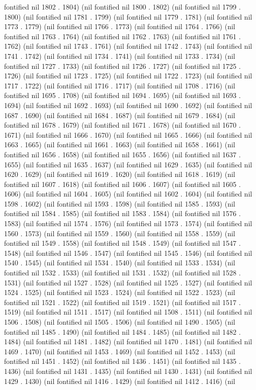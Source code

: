fontified nil 1802 . 1804) (nil fontified nil 1800 . 1802) (nil fontified nil 1799 . 1800) (nil fontified nil 1781 . 1799) (nil fontified nil 1779 . 1781) (nil fontified nil 1773 . 1779) (nil fontified nil 1766 . 1773) (nil fontified nil 1764 . 1766) (nil fontified nil 1763 . 1764) (nil fontified nil 1762 . 1763) (nil fontified nil 1761 . 1762) (nil fontified nil 1743 . 1761) (nil fontified nil 1742 . 1743) (nil fontified nil 1741 . 1742) (nil fontified nil 1734 . 1741) (nil fontified nil 1733 . 1734) (nil fontified nil 1727 . 1733) (nil fontified nil 1726 . 1727) (nil fontified nil 1725 . 1726) (nil fontified nil 1723 . 1725) (nil fontified nil 1722 . 1723) (nil fontified nil 1717 . 1722) (nil fontified nil 1716 . 1717) (nil fontified nil 1708 . 1716) (nil fontified nil 1695 . 1708) (nil fontified nil 1694 . 1695) (nil fontified nil 1693 . 1694) (nil fontified nil 1692 . 1693) (nil fontified nil 1690 . 1692) (nil fontified nil 1687 . 1690) (nil fontified nil 1684 . 1687) (nil fontified nil 1679 . 1684) (nil fontified nil 1678 . 1679) (nil fontified nil 1671 . 1678) (nil fontified nil 1670 . 1671) (nil fontified nil 1666 . 1670) (nil fontified nil 1665 . 1666) (nil fontified nil 1663 . 1665) (nil fontified nil 1661 . 1663) (nil fontified nil 1658 . 1661) (nil fontified nil 1656 . 1658) (nil fontified nil 1655 . 1656) (nil fontified nil 1637 . 1655) (nil fontified nil 1635 . 1637) (nil fontified nil 1629 . 1635) (nil fontified nil 1620 . 1629) (nil fontified nil 1619 . 1620) (nil fontified nil 1618 . 1619) (nil fontified nil 1607 . 1618) (nil fontified nil 1606 . 1607) (nil fontified nil 1605 . 1606) (nil fontified nil 1604 . 1605) (nil fontified nil 1602 . 1604) (nil fontified nil 1598 . 1602) (nil fontified nil 1593 . 1598) (nil fontified nil 1585 . 1593) (nil fontified nil 1584 . 1585) (nil fontified nil 1583 . 1584) (nil fontified nil 1576 . 1583) (nil fontified nil 1574 . 1576) (nil fontified nil 1573 . 1574) (nil fontified nil 1560 . 1573) (nil fontified nil 1559 . 1560) (nil fontified nil 1558 . 1559) (nil fontified nil 1549 . 1558) (nil fontified nil 1548 . 1549) (nil fontified nil 1547 . 1548) (nil fontified nil 1546 . 1547) (nil fontified nil 1545 . 1546) (nil fontified nil 1540 . 1545) (nil fontified nil 1534 . 1540) (nil fontified nil 1533 . 1534) (nil fontified nil 1532 . 1533) (nil fontified nil 1531 . 1532) (nil fontified nil 1528 . 1531) (nil fontified nil 1527 . 1528) (nil fontified nil 1525 . 1527) (nil fontified nil 1524 . 1525) (nil fontified nil 1523 . 1524) (nil fontified nil 1522 . 1523) (nil fontified nil 1521 . 1522) (nil fontified nil 1519 . 1521) (nil fontified nil 1517 . 1519) (nil fontified nil 1511 . 1517) (nil fontified nil 1508 . 1511) (nil fontified nil 1506 . 1508) (nil fontified nil 1505 . 1506) (nil fontified nil 1490 . 1505) (nil fontified nil 1485 . 1490) (nil fontified nil 1484 . 1485) (nil fontified nil 1482 . 1484) (nil fontified nil 1481 . 1482) (nil fontified nil 1470 . 1481) (nil fontified nil 1469 . 1470) (nil fontified nil 1453 . 1469) (nil fontified nil 1452 . 1453) (nil fontified nil 1451 . 1452) (nil fontified nil 1436 . 1451) (nil fontified nil 1435 . 1436) (nil fontified nil 1431 . 1435) (nil fontified nil 1430 . 1431) (nil fontified nil 1429 . 1430) (nil fontified nil 1416 . 1429) (nil fontified nil 1412 . 1416) (nil 